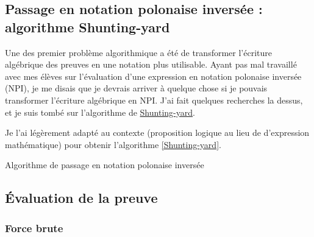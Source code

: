 \documentclass[12pt, algo]{cours}
\begin{document}
\subsection{Passage en notation polonaise inversée : algorithme Shunting-yard}

Une des premier problème algorithmique a été de transformer l'écriture algébrique des preuves en une notation plus utilisable. Ayant pas mal travaillé avec mes élèves sur l'évaluation d'une expression en notation polonaise inversée (NPI), je me disais que je devrais arriver à quelque chose si je pouvais transformer l'écriture algébrique en NPI. J'ai fait quelques recherches la dessus, et je suis tombé sur l'algorithme de \href{https://fr.wikipedia.org/wiki/Algorithme_Shunting-yard}{Shunting-yard}.

Je l'ai légèrement adapté au contexte (proposition logique au lieu de d'expression mathématique) pour obtenir l'algorithme \ref{Shunting-yard}.


\begin{algorithm}[h]
\caption{Algorithme de passage en notation polonaise inversée}
\label{Shunting-yard}
\end{algorithm}

\subsection{Évaluation de la preuve}

\subsubsection{Force brute}
\end{document}
